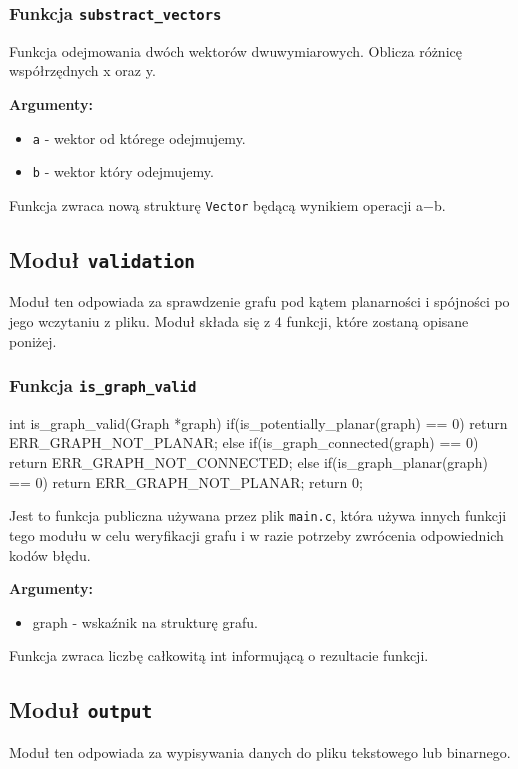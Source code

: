 \documentclass[]{article}
\begin{document}
\subsubsection{Funkcja \texttt{substract\_vectors}}

    Funkcja odejmowania dwóch wektorów dwuwymiarowych. Oblicza różnicę współrzędnych x oraz y.

\textbf{Argumenty:}
\begin{itemize}
\item \texttt{a} - wektor od którege odejmujemy.
\item \texttt{b} - wektor który odejmujemy.
\end{itemize}
Funkcja zwraca nową strukturę \texttt{Vector} będącą wynikiem operacji a−b.

\subsection{Moduł \texttt{validation}}
Moduł ten odpowiada za sprawdzenie grafu pod kątem planarności i spójności po jego wczytaniu z pliku. Moduł składa się z
4 funkcji, które zostaną opisane poniżej.

\subsubsection{Funkcja \texttt{is\_graph\_valid}}
\begin{mylisting}
int is_graph_valid(Graph *graph){
    if(is_potentially_planar(graph) == 0)
        return ERR_GRAPH_NOT_PLANAR;
    else if(is_graph_connected(graph) == 0){
        return ERR_GRAPH_NOT_CONNECTED;
    }
    else if(is_graph_planar(graph) == 0){
        return ERR_GRAPH_NOT_PLANAR;
    }
    return 0;
}
\end{mylisting}

Jest to funkcja publiczna używana przez plik \texttt{main.c}, która używa innych funkcji tego modułu w celu weryfikacji grafu
i w razie potrzeby zwrócenia odpowiednich kodów błędu.

\textbf{Argumenty:}
\begin{itemize}
    \item graph - wskaźnik na strukturę grafu.
\end{itemize}
Funkcja zwraca liczbę całkowitą int informującą o rezultacie funkcji.


\subsection{Moduł \texttt{output}}
Moduł ten odpowiada za wypisywania danych do pliku tekstowego lub binarnego.
\end{document}
